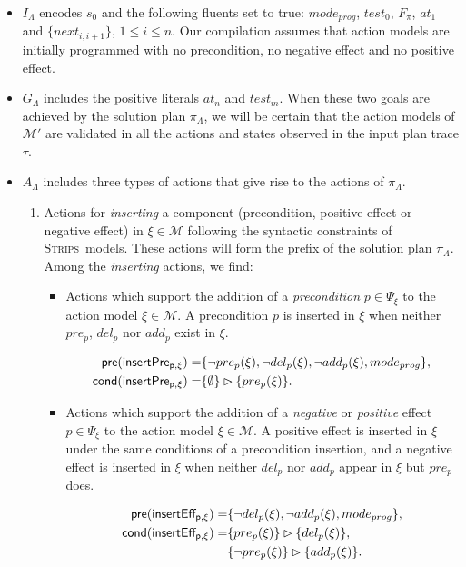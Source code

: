 \documentclass[runningheads]{llncs}
\newcommand{\pre}{\mathsf{pre}}     %
\newcommand{\cond}{\mathsf{cond}}   %
\newcommand{\strips}{\textsc{Strips}}     %
\begin{document}
\begin{itemize}
\item $I_{\Lambda}$ encodes $s_0$ and the following fluents set to true: $mode_{prog}$, $test_0$, $F_{\pi}$, $at_1$ and $\{next_{i,i+1}\}$, {\small $1\leq i \leq n$}. Our compilation assumes that action models are initially programmed with no precondition, no negative effect and no positive effect.

\item $G_{\Lambda}$ includes the positive literals $at_n$ and $test_m$. When these two goals are achieved by the solution plan $\pi_\Lambda$, we will be certain that the action models of $\mathcal{M'}$ are validated in all the actions and states observed in the input plan trace $\tau$.

\item $A_{\Lambda}$ includes three types of actions that give rise to the actions of $\pi_\Lambda$.
\begin{enumerate}
\item Actions for {\em inserting} a component (precondition, positive effect or negative effect) in $\xi \in \mathcal{M}$ following the syntactic constraints of \strips\ models. These actions will form the prefix of the solution plan $\pi_\Lambda$. Among the \emph{inserting} actions, we find:
\begin{itemize}
\item Actions which support the addition of a {\em precondition} $p\in \Psi_{\xi}$ to the action model $\xi\in\mathcal{M}$. A precondition $p$ is inserted in $\xi$ when neither $pre_p$, $del_p$ nor $add_p$ exist in $\xi$.

\begin{small}
\begin{align*}
\hspace*{7pt}\pre(\mathsf{insertPre_{p,\xi}})=&\{\neg pre_{p}(\xi), \neg del_{p}(\xi),\neg add_{p}(\xi), mode_{prog}\},\\
\cond(\mathsf{insertPre_{p,\xi}})=&\{\emptyset\}\rhd\{pre_{p}(\xi)\}.
\end{align*}
\end{small}

\item Actions which support the addition of a {\em negative} or {\em positive} effect $p\in \Psi_{\xi}$ to the action model $\xi\in\mathcal{M}$. A positive effect is inserted in $\xi$ under the same conditions of a precondition insertion, and a negative effect is inserted in $\xi$ when neither $del_p$ nor $add_p$ appear in $\xi$ but $pre_p$ does.

\begin{small}
\begin{align*}
\hspace*{7pt}\pre(\mathsf{insertEff_{p,\xi}})=&\{\neg del_{p}(\xi),\neg add_{p}(\xi), mode_{prog}\},\\
\cond(\mathsf{insertEff_{p,\xi}})=&\{pre_{p}(\xi)\}\rhd\{del_{p}(\xi)\},\\
& \{\neg pre_{p}(\xi)\}\rhd\{add_{p}(\xi)\}.
\end{align*}
\end{small}
\end{itemize}


\end{enumerate}
\end{itemize}
\end{document}
